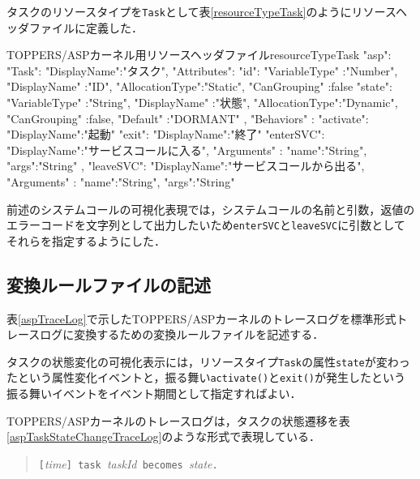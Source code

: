 タスクのリソースタイプを{\tt Task}として表\ref{resourceTypeTask}のようにリソースヘッダファイルに定義した．

\begin{File}{TOPPERS/ASPカーネル用リソースヘッダファイル}{resourceTypeTask}
{
  "asp":
  {
    "Task":{
      "DisplayName":"タスク",
      "Attributes":{
        "id":{
          "VariableType"  :"Number",
          "DisplayName"   :"ID",
          "AllocationType":"Static",
          "CanGrouping"   :false
        }
        "state":{
          "VariableType"  :"String",
          "DisplayName"   :"状態",
          "AllocationType":"Dynamic",
          "CanGrouping"   :false,
          "Default"       :"DORMANT"
        }
      },
      "Behaviors"  :{
        "activate":{
          "DisplayName":"起動"
        }
        "exit":{
          "DisplayName":"終了"
        }
        "enterSVC":{
          "DisplayName":"サービスコールに入る",
          "Arguments"  :{
            "name":"String",
            "args":"String"
          }
        },
        "leaveSVC":{
          "DisplayName":"サービスコールから出る",
          "Arguments"  :{
            "name":"String",
            "args":"String"
          }
        }
      }
    }
  }
}
\end{File}

前述のシステムコールの可視化表現では，システムコールの名前と引数，返値のエラーコードを文字列として出力したいため{\tt enterSVC}と{\tt leaveSVC}に引数としてそれらを指定するようにした．

\subsection{変換ルールファイルの記述}

表\ref{aspTraceLog}で示したTOPPERS/ASPカーネルのトレースログを標準形式トレースログに変換するための変換ルールファイルを記述する．

タスクの状態変化の可視化表示には，リソースタイプ{\tt Task}の属性{\tt state}が変わったという属性変化イベントと，振る舞い{\tt activate()}と{\tt exit()}が発生したという振る舞いイベントをイベント期間として指定すればよい．

TOPPERS/ASPカーネルのトレースログは，タスクの状態遷移を表\ref{aspTaskStateChangeTraceLog}のような形式で表現している．

\begin{table}[p]
\begin{quote}
\begin{breakbox}
{\tt [}{\it time}{\tt ] task }{\it taskId}{\tt \ becomes }{\it state}{\tt .}
\end{breakbox}
\caption{TOPPERS/ASPカーネルのトレースログにおけるタスクの状態遷移を表す形式}
\label{aspTaskStateChangeTraceLog}
\end{quote}
\end{table}

